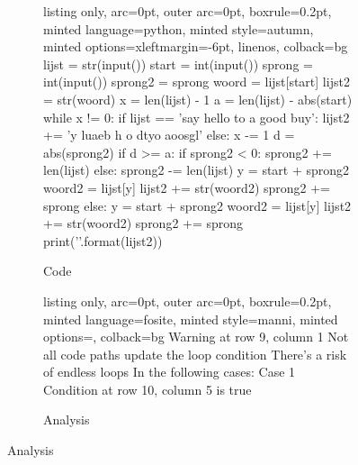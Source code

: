 
\begin{figure}[H]
\caption{Submision 2}
\label{sbm:sub2}
  \begin{subfigure}{\textwidth}
        \caption{Code}
        \label{sbm:sub2_code}

  \begin{tcblisting}{listing only, 
    arc=0pt,
    outer arc=0pt, 
    boxrule=0.2pt,
    minted language=python,
    minted style=autumn,
    minted options={xleftmargin=-6pt, linenos},
    colback=bg }
lijst = str(input())
start = int(input())
sprong = int(input())
sprong2 = sprong
woord = lijst[start]
lijst2 = str(woord)
x = len(lijst) - 1
a = len(lijst) - abs(start)
while x != 0:
    if lijst == 'say hello to a good buy':
        lijst2 += 'y luaeb h o dtyo aoosgl'
    else:
        x -= 1
        d = abs(sprong2)
        if d >= a:
            if sprong2 < 0:
                sprong2 += len(lijst)
            else:
                sprong2 -= len(lijst)
            y = start + sprong2
            woord2 = lijst[y]
            lijst2 += str(woord2)
            sprong2 += sprong
        else:
            y = start + sprong2
            woord2 = lijst[y]
            lijst2 += str(woord2)
            sprong2 += sprong
print('{}'.format(lijst2))
\end{tcblisting}
\end{subfigure}
\begin{subfigure}{\textwidth}
        \caption{Analysis}
        \label{sbm:sub2_anal}
\begin{tcblisting}{listing only, 
    arc=0pt,
    outer arc=0pt, 
    boxrule=0.2pt,
    minted language=fosite,
    minted style=manni,
    minted options={},
    colback=bg }
Warning at row 9, column 1
  Not all code paths update the loop condition
  There's a risk of endless loops
  In the following cases:
  Case 1
    Condition at row 10, column 5 is true
\end{tcblisting}
\end{subfigure}
\end{figure}

